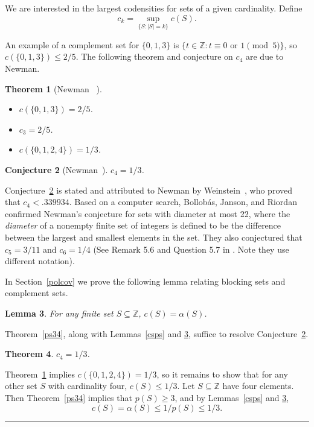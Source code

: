 \documentclass[12pt]{article}
\newenvironment{proof}{{\bf Proof:  }}{\hfill\rule{2mm}{2mm}}
\newtheorem{theorem}{Theorem}
\newtheorem{lemma}[theorem]{Lemma}
\newtheorem{conjecture}[theorem]{Conjecture}
\newcommand{\Z}{\ensuremath{\mathbb Z}}
\begin{document}
We are interested in the largest codensities for sets of a given cardinality.  Define 
\[c_k = \sup_{\{S:|S|=k\}}c(S).\]  

An example of a complement set for $\{0,1,3\}$ is $\{t \in \Z: t \equiv 0 \text{ or } 1 \pmod{5}\}$, so $c(\{0,1,3\}) \le 2/5$. The following theorem and conjecture on $c_4$ are due to Newman.

\begin{theorem}[Newman ~\cite{New67}]\label{newt}
\ 
\begin{itemize}
\item $c(\{0,1,3\}) = 2/5$.
\item $c_3 = 2/5$.
\item $c(\{0,1,2,4\}) = 1/3$.
\end{itemize}
\end{theorem}

\begin{conjecture}[Newman~\cite{New67}]\label{c4conj}
 $c_4 = 1/3$. 
 \end{conjecture}
 
Conjecture~\ref{c4conj} is stated and attributed to Newman by Weinstein~\cite{Wei76}, who proved that $c_4 < .339934$. Based on a computer search, Bollob\'as, Janson, and Riordan \cite{BJR11} confirmed Newman's conjecture for sets with diameter at most 22, where the \textit{diameter} of a nonempty finite set of integers is defined to be the difference between the largest and smallest elements in the set.  They also conjectured that $c_5 = 3/11$ and $c_6  = 1/4$ (See Remark 5.6 and Question 5.7 in \cite{BJR11}.  Note they use different notation).

In Section~\ref{polcov} we prove the following lemma relating blocking sets and complement sets.
\begin{lemma}\label{alphc}
For any finite set $S \subseteq \Z$, $c(S)= \alpha(S)$. 
\end{lemma}

Theorem~\ref{ps34}, along with Lemmas~\ref{csps} and \ref{alphc}, suffice to resolve Conjecture~\ref{c4conj}.

\begin{theorem}\label{c413}
 $c_4=1/3$.
\end{theorem}

\begin{proof}
Theorem~\ref{newt} implies $c(\{0,1,2,4\})=1/3$, so it remains to show that for any other set $S$ with cardinality four, $c(S) \le 1/3$.  Let $S \subseteq \Z$ have four elements.  Then Theorem~\ref{ps34} implies that $p(S) \ge 3$, and by Lemmas~\ref{csps} and \ref{alphc},
\[c(S) = \alpha(S) \le 1/p(S) \le 1/3.\]
\end{proof}
\end{document}
